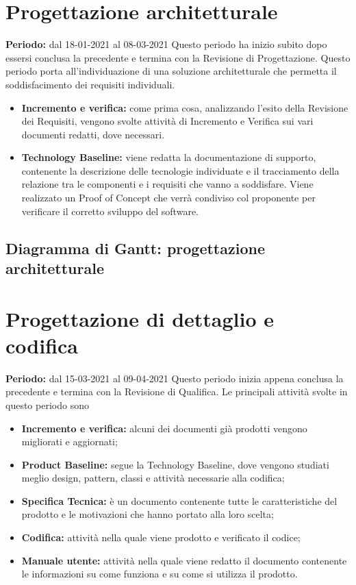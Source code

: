 \section{Progettazione architetturale}\label{4.3}
\textbf{Periodo:} dal 18-01-2021 al 08-03-2021
Questo periodo ha inizio subito dopo essersi conclusa la precedente e termina con la Revisione di Progettazione.
Questo periodo porta all'individuazione di una soluzione architetturale che permetta il soddisfacimento dei requisiti individuali.
\begin{itemize}
	\item \textbf{Incremento e verifica:} come prima cosa, analizzando l'esito della Revisione dei Requisiti, vengono svolte attività di Incremento e Verifica sui vari documenti redatti, dove necessari.
	\item \textbf{Technology Baseline:} viene redatta la documentazione di supporto, contenente la descrizione delle tecnologie individuate e il tracciamento della relazione tra le componenti e i requisiti che vanno a soddisfare.
	Viene realizzato un Proof of Concept che verrà condiviso col proponente per verificare il corretto sviluppo del software.
\end{itemize}
\subsection{Diagramma di Gantt: progettazione architetturale}\label{4.3.1}

\section{Progettazione di dettaglio e codifica}\label{4.4}
\textbf{Periodo:} dal 15-03-2021 al 09-04-2021
Questo periodo inizia appena conclusa la precedente e termina con la Revisione di Qualifica.
Le principali attività svolte in questo periodo sono
\begin{itemize}
	\item \textbf{Incremento e verifica:} alcuni dei documenti già prodotti vengono migliorati e aggiornati;
	\item \textbf{Product Baseline:} segue la Technology Baseline, dove vengono studiati meglio design, pattern, classi e attività necessarie alla codifica;
	\item \textbf{Specifica Tecnica:} è un documento contenente tutte le caratteristiche del prodotto e le motivazioni che hanno portato alla loro scelta;
	\item \textbf{Codifica:} attività nella quale viene prodotto e verificato il codice;
	\item \textbf{Manuale utente:} attività nella quale viene redatto il documento contenente le informazioni su come funziona e su come si utilizza il prodotto.
\end{itemize}

